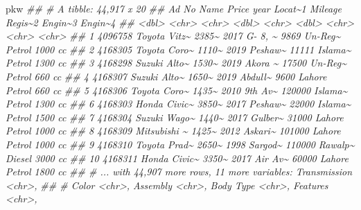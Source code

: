 \documentclass[
  letterpaper,
  DIV=11,
  numbers=noendperiod]{scrartcl}
\newenvironment{Shaded}{\begin{snugshade}}{\end{snugshade}}
\newcommand{\DocumentationTok}[1]{\textcolor[rgb]{0.37,0.37,0.37}{\textit{#1}}}
\newcommand{\NormalTok}[1]{\textcolor[rgb]{0.00,0.23,0.31}{#1}}
\begin{document}
\begin{Shaded}
\begin{Highlighting}[]
\NormalTok{pkw}
\DocumentationTok{\#\# \# A tibble: 44,917 x 20}
\DocumentationTok{\#\#    \textasciigrave{}Ad No\textasciigrave{} Name         Price  year Locat\textasciitilde{}1 Mileage Regis\textasciitilde{}2 Engin\textasciitilde{}3 Engin\textasciitilde{}4}
\DocumentationTok{\#\#      \textless{}dbl\textgreater{} \textless{}chr\textgreater{}        \textless{}chr\textgreater{} \textless{}dbl\textgreater{} \textless{}chr\textgreater{}     \textless{}dbl\textgreater{} \textless{}chr\textgreater{}   \textless{}chr\textgreater{}   \textless{}chr\textgreater{}  }
\DocumentationTok{\#\#  1 4096758 Toyota Vitz\textasciitilde{} 2385\textasciitilde{}  2017 G{-} 8, \textasciitilde{}    9869 Un{-}Reg\textasciitilde{} Petrol  1000 cc}
\DocumentationTok{\#\#  2 4168305 Toyota Coro\textasciitilde{} 1110\textasciitilde{}  2019 Peshaw\textasciitilde{}   11111 Islama\textasciitilde{} Petrol  1300 cc}
\DocumentationTok{\#\#  3 4168298 Suzuki Alto\textasciitilde{} 1530\textasciitilde{}  2019 Akora \textasciitilde{}   17500 Un{-}Reg\textasciitilde{} Petrol  660 cc }
\DocumentationTok{\#\#  4 4168307 Suzuki Alto\textasciitilde{} 1650\textasciitilde{}  2019 Abdull\textasciitilde{}    9600 Lahore  Petrol  660 cc }
\DocumentationTok{\#\#  5 4168306 Toyota Coro\textasciitilde{} 1435\textasciitilde{}  2010 9th Av\textasciitilde{}  120000 Islama\textasciitilde{} Petrol  1300 cc}
\DocumentationTok{\#\#  6 4168303 Honda Civic\textasciitilde{} 3850\textasciitilde{}  2017 Peshaw\textasciitilde{}   22000 Islama\textasciitilde{} Petrol  1500 cc}
\DocumentationTok{\#\#  7 4168304 Suzuki Wago\textasciitilde{} 1440\textasciitilde{}  2017 Gulber\textasciitilde{}   31000 Lahore  Petrol  1000 cc}
\DocumentationTok{\#\#  8 4168309 Mitsubishi \textasciitilde{} 1425\textasciitilde{}  2012 Askari\textasciitilde{}  101000 Lahore  Petrol  1000 cc}
\DocumentationTok{\#\#  9 4168310 Toyota Prad\textasciitilde{} 2650\textasciitilde{}  1998 Sargod\textasciitilde{}  110000 Rawalp\textasciitilde{} Diesel  3000 cc}
\DocumentationTok{\#\# 10 4168311 Honda Civic\textasciitilde{} 3350\textasciitilde{}  2017 Air Av\textasciitilde{}   60000 Lahore  Petrol  1800 cc}
\DocumentationTok{\#\# \# ... with 44,907 more rows, 11 more variables: Transmission \textless{}chr\textgreater{},}
\DocumentationTok{\#\# \#   Color \textless{}chr\textgreater{}, Assembly \textless{}chr\textgreater{}, \textasciigrave{}Body Type\textasciigrave{} \textless{}chr\textgreater{}, Features \textless{}chr\textgreater{},}

\end{Highlighting}
\end{Shaded}
\end{document}
